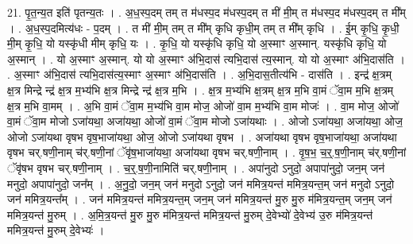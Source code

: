 \documentclass[17pt]{extarticle}
\begin{document}
21. पृ॒त॒न्य॒त इति॑ पृतन्य॒तः । . अ॒ध॒स्प॒दम् तम् त म॑धस्प॒द म॑धस्प॒दम् त मी॑ मी॒म् त म॑धस्प॒द म॑धस्प॒दम् त मी᳚म् । . अ॒ध॒स्प॒दमित्य॑धः - प॒दम् । . त मी॑ मी॒म् तम् त मी᳚म् कृधि कृधी॒म् तम् त मी᳚म् कृधि । . ई॒म् कृ॒धि॒ कृ॒धी॒ मी॒म् कृ॒धि॒ यो यस्कृ॑धी मीम् कृधि॒ यः । . कृ॒धि॒ यो यस्कृ॑धि कृधि॒ यो अ॒स्माꣳ अ॒स्मान्. यस्कृ॑धि कृधि॒ यो अ॒स्मान् । . यो अ॒स्माꣳ अ॒स्मान्. यो यो अ॒स्माꣳ अ॑भि॒दास॑ त्यभि॒दास॑ त्य॒स्मान्. यो यो अ॒स्माꣳ अ॑भि॒दास॑ति । . अ॒स्माꣳ अ॑भि॒दास॑ त्यभि॒दास॑त्य॒स्माꣳ अ॒स्माꣳ अ॑भि॒दास॑ति । . अ॒भि॒दास॒तीत्य॑भि - दास॑ति । . इन्द्र॑ क्ष॒त्रम् क्ष॒त्र मिन्द्रे न्द्र॑ क्ष॒त्र म॒भ्य॑भि क्ष॒त्र मिन्द्रे न्द्र॑ क्ष॒त्र म॒भि । . क्ष॒त्र म॒भ्य॑भि क्ष॒त्रम् क्ष॒त्र म॒भि वा॒मं ॅवा॒म म॒भि क्ष॒त्रम् क्ष॒त्र म॒भि वा॒मम् । . अ॒भि वा॒मं ॅवा॒म म॒भ्य॑भि वा॒म मोज॒ ओजो॑ वा॒म म॒भ्य॑भि वा॒म मोजः॑ । . वा॒म मोज॒ ओजो॑ वा॒मं ॅवा॒म मोजो ऽजा॑यथा॒ अजा॑यथा॒ ओजो॑ वा॒मं ॅवा॒म मोजो ऽजा॑यथाः । . ओजो ऽजा॑यथा॒ अजा॑यथा॒ ओज॒ ओजो ऽजा॑यथा वृषभ वृष॒भाजा॑यथा॒ ओज॒ ओजो ऽजा॑यथा वृषभ । . अजा॑यथा वृषभ वृष॒भाजा॑यथा॒ अजा॑यथा वृषभ चर्.षणी॒नाम् च॑र्.षणी॒नां ॅवृ॑ष॒भाजा॑यथा॒ अजा॑यथा वृषभ चर्.षणी॒नाम् । . वृ॒ष॒भ॒ च॒र्॒.ष॒णी॒नाम् च॑र्.षणी॒नां ॅवृ॑षभ वृषभ चर्.षणी॒नाम् । . च॒र्॒.ष॒णी॒नामिति॑ चर्.षणी॒नाम् । . अपा॑नुदो ऽनुदो॒ अपापा॑नुदो॒ जन॒म् जन॑ मनुदो॒ अपापा॑नुदो॒ जन᳚म् । . अ॒नु॒दो॒ जन॒म् जन॑ मनुदो ऽनुदो॒ जन॑ ममित्र॒यन्त॑ ममित्र॒यन्त॒म् जन॑ मनुदो ऽनुदो॒ जन॑ ममित्र॒यन्त᳚म् । . जन॑ ममित्र॒यन्त॑ ममित्र॒यन्त॒म् जन॒म् जन॑ ममित्र॒यन्त॑ मु॒रु मु॒रु म॑मित्र॒यन्त॒म् जन॒म् जन॑ ममित्र॒यन्त॑ मु॒रुम् । . अ॒मि॒त्र॒यन्त॑ मु॒रु मु॒रु म॑मित्र॒यन्त॑ ममित्र॒यन्त॑ मु॒रुम् दे॒वेभ्यो॑ दे॒वेभ्य॑ उ॒रु म॑मित्र॒यन्त॑ ममित्र॒यन्त॑ मु॒रुम् दे॒वेभ्यः॑ । \newline
\end{document}
